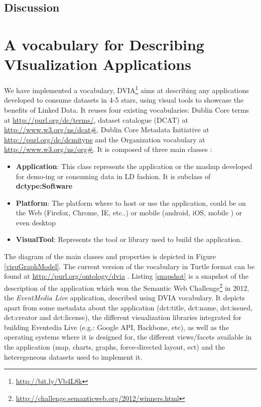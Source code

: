 \subsection{Discussion}
\label{sec:discuss}


\section{A vocabulary for Describing VIsualization Applications} \label{sec:dvia}

We have implemented a vocabulary, DVIA\footnote{\url{http://bit.ly/Vb4L8k}} aims at describing any applications developed to consume datasets in 4-5 stars, using visual tools to showcase the benefits of Linked Data. It reuses four existing vocabularies: Dublin Core terms at \url{http://purl.org/dc/terms/}, dataset catalogue (DCAT) at \url{http://www.w3.org/ns/dcat#}, Dublin Core Metadata Initiative at \url{http://purl.org/dc/dcmitype} and the Organization vocabulary at \url{http://www.w3.org/ns/org#}.  It is composed of three main classes : 

\begin{itemize}
\item \textbf{Application}: This class represents the application or the mashup developed for demo-ing or consuming data in LD fashion. It is subclass of \textbf{dctype:Software}
\item \textbf{Platform}: The platform where to host or use the application, could be on the Web (Firefox, Chrome, IE, etc..) or mobile (android, iOS, mobile ) or even desktop
\item \textbf{VisualTool}: Represents the tool or library used to build the application. 
\end{itemize}

The diagram of the main classes and properties is depicted in Figure \ref{visuGraphModel}. The current version of the vocabulary in Turtle format can be found at \url{http://purl.org/ontology/dvia} .  Listing \ref{snapshot} is a snapshot of the description of the application which won the Semantic Web Challenge\footnote{\url{http://challenge.semanticweb.org/2012/winners.html}} in 2012, the \textit{EventMedia Live} application, described using DVIA vocabulary. It depicts apart from some metadata about the application (dct:title, dct:name, dct:issued, dct:creator and dct:license), the different visualization libraries integrated for building Eventedia Live (e.g.: Google API, Backbone, etc), as well as the operating systems where it is designed for, the different views/facets available in the application (map, charts, graphs, force-directed layout, ect) and the heteregeneous datasets used to implement it. 

